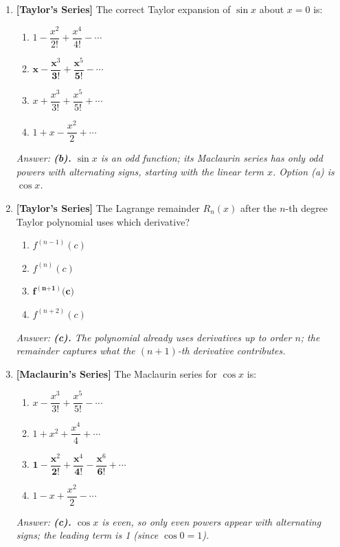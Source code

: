 \documentclass[12pt,a4paper]{article}
\begin{document}
\begin{enumerate}[leftmargin=2em, label=\textbf{Q\arabic*.}]

\item \textbf{[Taylor's Series]} The correct Taylor expansion of \(\sin x\) about \(x = 0\) is:
\begin{enumerate}[label=(\alph*)]
  \item \(1 - \dfrac{x^2}{2!} + \dfrac{x^4}{4!} - \cdots\)
  \item \(\textbf{x} - \dfrac{\textbf{x}^3}{\textbf{3!}} + \dfrac{\textbf{x}^5}{\textbf{5!}} - \cdots\)
  \item \(x + \dfrac{x^3}{3!} + \dfrac{x^5}{5!} + \cdots\)
  \item \(1 + x - \dfrac{x^2}{2} + \cdots\)
\end{enumerate}
\textit{Answer: \textbf{(b).} \(\sin x\) is an odd function; its Maclaurin series has only
odd powers with alternating signs, starting with the linear term \(x\).
Option (a) is \(\cos x\).}

\item \textbf{[Taylor's Series]} The Lagrange remainder \(R_n(x)\) after the \(n\)-th degree
Taylor polynomial uses which derivative?
\begin{enumerate}[label=(\alph*)]
  \item \(f^{(n-1)}(c)\)
  \item \(f^{(n)}(c)\)
  \item \(\textbf{f}^{(\textbf{n+1})}\textbf{(c)}\)
  \item \(f^{(n+2)}(c)\)
\end{enumerate}
\textit{Answer: \textbf{(c).} The polynomial already uses derivatives up to order \(n\);
the remainder captures what the \((n+1)\)-th derivative contributes.}

\item \textbf{[Maclaurin's Series]} The Maclaurin series for \(\cos x\) is:
\begin{enumerate}[label=(\alph*)]
  \item \(x - \dfrac{x^3}{3!} + \dfrac{x^5}{5!} - \cdots\)
  \item \(1 + x^2 + \dfrac{x^4}{4} + \cdots\)
  \item \(\textbf{1} - \dfrac{\textbf{x}^2}{\textbf{2!}} + \dfrac{\textbf{x}^4}{\textbf{4!}} - \dfrac{\textbf{x}^6}{\textbf{6!}} + \cdots\)
  \item \(1 - x + \dfrac{x^2}{2} - \cdots\)
\end{enumerate}
\textit{Answer: \textbf{(c).} \(\cos x\) is even, so only even powers appear with alternating
signs; the leading term is 1 (since \(\cos 0 = 1\)).}


\end{enumerate}
\end{document}
